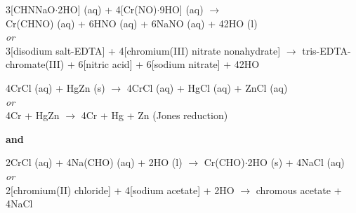 \begin{center}
  3[CHNNaO$\cdot$2HO] (aq) + 4[Cr(NO)$\cdot$9HO] (aq) $\rightarrow$ \\ Cr(CHNO) (aq) + 6HNO (aq) + 6NaNO (aq) + 42HO (l) \\
    \textit{or} \\
  3[disodium salt-EDTA] + 4[chromium(III) nitrate nonahydrate] $\rightarrow$ tris-EDTA-chromate(III) + 6[nitric acid] + 6[sodium nitrate] + 42HO
\end{center}


\begin{center}
  4CrCl (aq) + HgZn (s) $\rightarrow$ 4CrCl (aq) + HgCl (aq) + ZnCl (aq) \\
    \textit{or} \\
  4Cr + HgZn $\rightarrow$ 4Cr + Hg + Zn   (Jones reduction) \bigskip

    \textbf{and} \bigskip

  2CrCl (aq) + 4Na(CHO) (aq) + 2HO (l) $\rightarrow$ Cr(CHO)$\cdot$2HO (s) + 4NaCl (aq) \\
    \textit{or} \\
  2[chromium(II) chloride] + 4[sodium acetate] + 2HO $\rightarrow$ chromous acetate + 4NaCl \\
\end{center}
